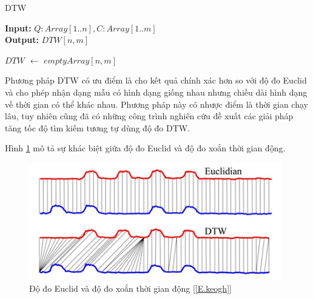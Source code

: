 \documentclass[13pt,oneside]{scrbook}
\newcommand*\Let[2]{\State #1 $\gets$ #2}
\begin{document}
\begin{itemize}
\begin{algorithm}[h!]
  \caption{DTW
   \label{alg:DTW}}
    \textbf{Input:} $Q: Array[1.. n], C: Array[1 .. m]$\\
    \textbf{Output:} $DTW[n, m] $
  \begin{algorithmic}[1]
      \Let{$DTW$}{$empty Array[n, m]$}
          \EndFor
      \EndFor
      \State {}
  \end{algorithmic}
\end{algorithm}
Phương pháp DTW có ưu điểm là cho kết
quả chính xác hơn so với độ đo Euclid và cho phép nhận dạng mẫu có hình dạng giống nhau nhưng chiều dài hình dạng về thời gian có thể khác nhau. Phương pháp này có nhược điểm là thời gian chạy lâu, tuy nhiên cũng đã có những công trình nghiên cứu đề xuất các giải pháp tăng tốc độ tìm kiếm tương tự
dùng độ đo DTW.

Hình \ref{SosanhEu_DTW.png} mô tả sự khác biệt giữa độ đo Euclid và độ đo xoắn thời gian động.
\end{itemize}

\begin{figure}[h!]
	\begin{center}
		\includegraphics[width=110mm]{SosanhEu_DTW.png}
		\caption{Độ đo Euclid và độ đo xoắn thời gian động [\ref{E.keogh}] }
		\label{SosanhEu_DTW.png}
	\end{center}
\end{figure}
\end{document}
